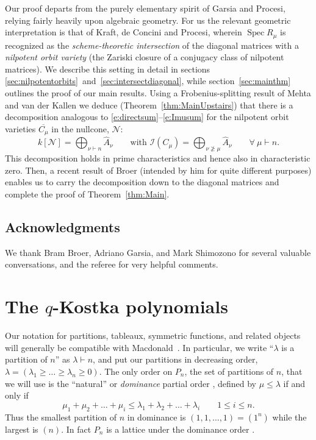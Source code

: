 \documentclass[12pt]{article}
\newcommand{\la}{{\lambda}}
\newcommand{\ptn}{\vdash}
\newcommand{\bigdsum}{\bigoplus}
\newcommand{\I}{{\mathcal{I}}}
\newcommand{\n}{{\mathcal{N}}}
\newcommand{\Cmu}{C_{\mu}}
\newcommand{\closure}[1]{\overline{#1}}
\newcommand{\Cbar}[1]{\closure{C_{#1}}}
\newcommand{\Cmubar}{\Cbar{\mu}}
\numberwithin{equation}{section}
\theoremstyle{plain}
\theoremstyle{definition}
\theoremstyle{remark}
\begin{document}
Our proof departs from the purely elementary spirit of Garsia and
Procesi, relying fairly heavily upon algebraic geometry.  For us the
relevant geometric interpretation is that of Kraft, de Concini and
Procesi, wherein $\operatorname{Spec} R_{\mu }$ is recognized as the
{\em scheme-theoretic intersection} of the diagonal matrices with a
{\em nilpotent orbit variety} (the Zariski closure of a conjugacy
class of nilpotent matrices).  We describe this setting in detail in
sections \ref{sec:nilpotentorbits}~and~\ref{sec:intersectdiagonal},
while section~\ref{sec:mainthm} outlines the proof of our main
results.  Using a Frobenius-splitting result of Mehta and van der
Kallen we deduce (Theorem~\ref{thm:MainUpstairs}) that there is a
decomposition analogous to \eqref{e:directsum}--\eqref{e:Imusum}
for the nilpotent orbit varieties $\Cmubar$ in the nullcone, $\n$:
\begin{equation}
k[\n] = \bigdsum_{\nu\ptn n} \hat{A}_{\nu}
\qquad\text{with }
\I(\Cmu)=\bigdsum_{\nu\not\geq\mu}\hat{A}_{\nu}\qquad\forall\ \mu\ptn n.
\end{equation}
This decomposition holds in prime characteristics and hence also in
characteristic zero.  Then, a recent result of Broer (intended by him
for quite different purposes) enables us to carry the decomposition
down to the diagonal matrices and complete the proof of
Theorem~\ref{thm:Main}.

\subsection{Acknowledgments} We thank Bram Broer, Adriano Garsia, and Mark
Shimozono for several valuable conversations, and the referee for very
helpful comments.
 
\section{The $q$-Kostka polynomials}
\label{combinatorialsection}
Our notation for partitions, tableaux, symmetric functions, and
related objects will generally be compatible with
Macdonald~\cite{Macdonald}.  In particular, we write ``$\lambda$ is a
partition of $n$'' as $\la\ptn n$, and put our partitions in
decreasing order, $\la=(\la_1\geq\dots\geq\la_n\geq0)$.  The only
order on $P_{n}$, the set of partitions of $n$, that we will use is
the ``natural'' or {\em dominance} partial order
\cite[I.1]{Macdonald}, defined by $\mu \leq \la$ if and only if
\begin{equation}
\mu_1 + \mu_2 + \dots + \mu_i \leq \la_1+\la_2+\dots+\la_i \qquad 
1\leq i \leq n.
\end{equation}
Thus the smallest partition of $n$ in dominance is
$(1,1,\dots,1)=(1^n)$ while the largest is $(n)$.  In fact $P_{n}$ is
a lattice under the dominance order \cite[p. 11]{Macdonald}.
\end{document}
